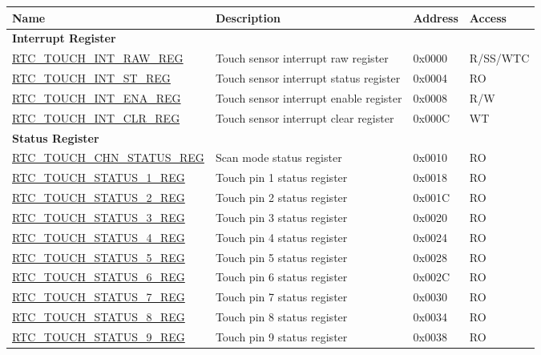 \begin{longtable}{ | l | p{7.2cm} | p{1.3cm} | p{1.7cm} | }
\hline\rowcolor{lightgray}
\textbf{Name} & \textbf{Description} &  \textbf{Address} & \textbf{Access} \\ \hline
\endhead
\multicolumn{4}{|l|}{\textbf{Interrupt Register}} \\ \hline
\hyperref[regdesc:RTCTOUCHINTRAWREG]{RTC\_TOUCH\_INT\_RAW\_REG} & Touch sensor interrupt raw register & 0x0000 & R/SS/WTC \\ \hline
\hyperref[regdesc:RTCTOUCHINTSTREG]{RTC\_TOUCH\_INT\_ST\_REG} & Touch sensor interrupt status register & 0x0004 & RO \\ \hline
\hyperref[regdesc:RTCTOUCHINTENAREG]{RTC\_TOUCH\_INT\_ENA\_REG} & Touch sensor interrupt enable register & 0x0008 & R/W \\ \hline
\hyperref[regdesc:RTCTOUCHINTCLRREG]{RTC\_TOUCH\_INT\_CLR\_REG} & Touch sensor interrupt clear register & 0x000C & WT \\ \hline
\multicolumn{4}{|l|}{\textbf{Status Register}} \\ \hline
\hyperref[regdesc:RTCTOUCHCHNSTATUSREG]{RTC\_TOUCH\_CHN\_STATUS\_REG} & Scan mode status register & 0x0010 & RO \\ \hline
\hyperref[regdesc:RTCTOUCHSTATUS0REG]{RTC\_TOUCH\_STATUS\_1\_REG} & Touch pin 1 status register & 0x0018 & RO \\ \hline
\hyperref[regdesc:RTCTOUCHSTATUS0REG]{RTC\_TOUCH\_STATUS\_2\_REG} & Touch pin 2 status register & 0x001C & RO \\ \hline
\hyperref[regdesc:RTCTOUCHSTATUS0REG]{RTC\_TOUCH\_STATUS\_3\_REG} & Touch pin 3 status register & 0x0020 & RO \\ \hline
\hyperref[regdesc:RTCTOUCHSTATUS0REG]{RTC\_TOUCH\_STATUS\_4\_REG} & Touch pin 4 status register & 0x0024 & RO \\ \hline
\hyperref[regdesc:RTCTOUCHSTATUS0REG]{RTC\_TOUCH\_STATUS\_5\_REG} & Touch pin 5 status register & 0x0028 & RO \\ \hline
\hyperref[regdesc:RTCTOUCHSTATUS0REG]{RTC\_TOUCH\_STATUS\_6\_REG} & Touch pin 6 status register & 0x002C & RO \\ \hline
\hyperref[regdesc:RTCTOUCHSTATUS0REG]{RTC\_TOUCH\_STATUS\_7\_REG} & Touch pin 7 status register & 0x0030 & RO \\ \hline
\hyperref[regdesc:RTCTOUCHSTATUS0REG]{RTC\_TOUCH\_STATUS\_8\_REG} & Touch pin 8 status register & 0x0034 & RO \\ \hline
\hyperref[regdesc:RTCTOUCHSTATUS0REG]{RTC\_TOUCH\_STATUS\_9\_REG} & Touch pin 9 status register & 0x0038 & RO \\ \hline

\end{longtable}
